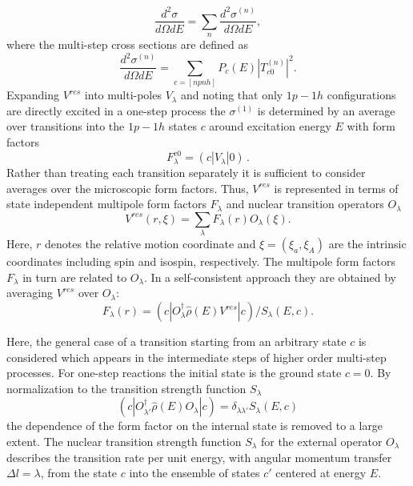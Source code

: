\documentclass[twocolumn,amsmath,amssymb,10pt,groupedaddress,letter]{revtex4}
\begin{document}
\begin{equation}
\frac{d^{2}\sigma}{d\Omega dE}=\sum_{n}{\frac{d^{2}\sigma^{(n)}}{d\Omega dE}},\label{sigma0}
\end{equation}
\noindent where the multi-step cross sections are defined as
\begin{equation}
\frac{d^{2}\sigma^{(n)}}{d\Omega dE}=\sum_{c=[npnh]}{P_{c}(E)|T_{c0}^{(n)}|^{2}}.\label{sign}
\end{equation}
\noindent Expanding $V^{res}$ into multi-poles $V_{\lambda}$ and noting that
only $1p-1h$ configurations are directly excited in a one-step process
the $\sigma^{(1)}$ is determined by an average over transitions into
the $1p-1h$ states $c$ around excitation energy $E$ with form factors
\begin{equation}
F_{\lambda}^{c0}=(c|V_{\lambda}|0)\,.
\end{equation}
\noindent Rather than treating each transition separately it is sufficient to
consider averages over the microscopic form factors. Thus, $V^{res}$
is represented in terms of state independent multipole form factors
$F_{\lambda}$ and nuclear transition operators $O_{\lambda}$
\begin{equation}
V^{res}(r,\xi)=\sum_{\lambda}{F_{\lambda}(r)O_{\lambda}(\xi)}.\label{vres}
\end{equation}
\noindent Here, $r$ denotes the relative motion coordinate and $\xi=(\xi_{a},\xi_{A})$
are the intrinsic coordinates including spin and isospin, respectively.
The multipole form factors $F_{\lambda}$ in turn are related to $O_{\lambda}$.
In a self-consistent approach they are obtained by averaging $V^{res}$
over $O_{\lambda}$:
\begin{equation}
F_{\lambda}(r)=(c|O_{\lambda}^{\dag}\hat{\rho}(E)V^{res}|c)/S_{\lambda}(E,c).\label{formf}
\end{equation}

Here, the general case of a transition starting from an arbitrary
state $c$ is considered which appears in the intermediate steps of
higher order multi-step processes. For one-step reactions the initial
state is the ground state $c=0$. By normalization to the transition
strength function $S_{\lambda}$
\begin{equation}
(c|O_{\lambda'}^{\dag}\hat{\rho}(E)O_{\lambda}|c)=\delta_{\lambda\lambda'}S_{\lambda}(E,c)\label{slambda}
\end{equation}
\noindent the dependence of the form factor on the internal state is removed
to a large extent.
The nuclear transition strength function $S_{\lambda}$ for the external operator
$O_{\lambda}$ describes the transition rate per unit energy, with angular momentum transfer
$\Delta l=\lambda$, from the state
$c$ into the ensemble of states $c'$ centered at energy $E$.
\end{document}
